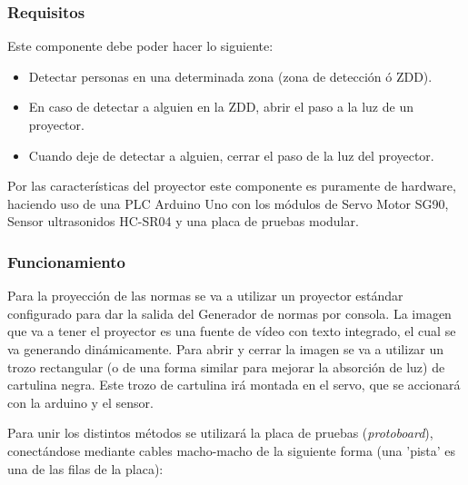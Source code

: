 \documentclass[12pt,twocolumn]{article}
\begin{document}
	\subsubsection{Requisitos}	
	Este componente debe poder hacer lo siguiente:
	\begin{itemize}
	\setlength\itemsep{-0.3em}
	\item Detectar personas en una determinada zona (zona de detección ó ZDD).
	\item En caso de detectar a alguien en la ZDD, abrir el paso a la luz de un proyector.
	\item Cuando deje de detectar a alguien, cerrar el paso de la luz del proyector.
	\end{itemize}
	
	Por las características del proyector este componente es puramente de hardware, haciendo uso de una PLC Arduino Uno con los módulos de Servo Motor SG90, Sensor ultrasonidos HC-SR04 y una placa de pruebas modular. 
	
	\subsubsection{Funcionamiento}

Para la proyección de las normas se va a utilizar un proyector estándar configurado para dar la salida del Generador de normas por consola. La imagen que va a tener el proyector es una fuente de vídeo con texto integrado, el cual se va generando dinámicamente. Para abrir y cerrar la imagen se va a utilizar un trozo rectangular (o de una forma similar para mejorar la absorción de luz) de cartulina negra. Este trozo de cartulina irá montada en el servo, que se accionará con la arduino y el sensor. 

Para unir los distintos métodos se utilizará la placa de pruebas (\textit{protoboard}), conectándose mediante cables macho-macho de la siguiente forma (una 'pista' es una de las filas de la placa):
\end{document}
